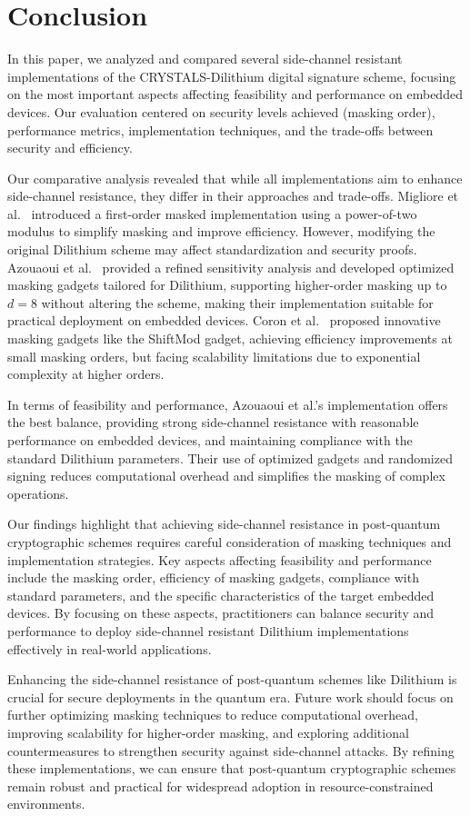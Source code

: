 
\chapter{Conclusion}
\thispagestyle{chapterstart}

In this paper, we analyzed and compared several side-channel resistant implementations of the CRYSTALS-Dilithium digital signature scheme, focusing on the most important aspects affecting feasibility and performance on embedded devices. Our evaluation centered on security levels achieved (masking order), performance metrics, implementation techniques, and the trade-offs between security and efficiency.

Our comparative analysis revealed that while all implementations aim to enhance side-channel resistance, they differ in their approaches and trade-offs. Migliore et al.\ \cite{Migliore19} introduced a first-order masked implementation using a power-of-two modulus to simplify masking and improve efficiency. However, modifying the original Dilithium scheme may affect standardization and security proofs. Azouaoui et al.\ \cite{Azouaoui22} provided a refined sensitivity analysis and developed optimized masking gadgets tailored for Dilithium, supporting higher-order masking up to $d=8$ without altering the scheme, making their implementation suitable for practical deployment on embedded devices. Coron et al.\ \cite{Coron23} proposed innovative masking gadgets like the ShiftMod gadget, achieving efficiency improvements at small masking orders, but facing scalability limitations due to exponential complexity at higher orders.

In terms of feasibility and performance, Azouaoui et al.'s implementation offers the best balance, providing strong side-channel resistance with reasonable performance on embedded devices, and maintaining compliance with the standard Dilithium parameters. Their use of optimized gadgets and randomized signing reduces computational overhead and simplifies the masking of complex operations.

Our findings highlight that achieving side-channel resistance in post-quantum cryptographic schemes requires careful consideration of masking techniques and implementation strategies. Key aspects affecting feasibility and performance include the masking order, efficiency of masking gadgets, compliance with standard parameters, and the specific characteristics of the target embedded devices. By focusing on these aspects, practitioners can balance security and performance to deploy side-channel resistant Dilithium implementations effectively in real-world applications.

Enhancing the side-channel resistance of post-quantum schemes like Dilithium is crucial for secure deployments in the quantum era. Future work should focus on further optimizing masking techniques to reduce computational overhead, improving scalability for higher-order masking, and exploring additional countermeasures to strengthen security against side-channel attacks. By refining these implementations, we can ensure that post-quantum cryptographic schemes remain robust and practical for widespread adoption in resource-constrained environments.
